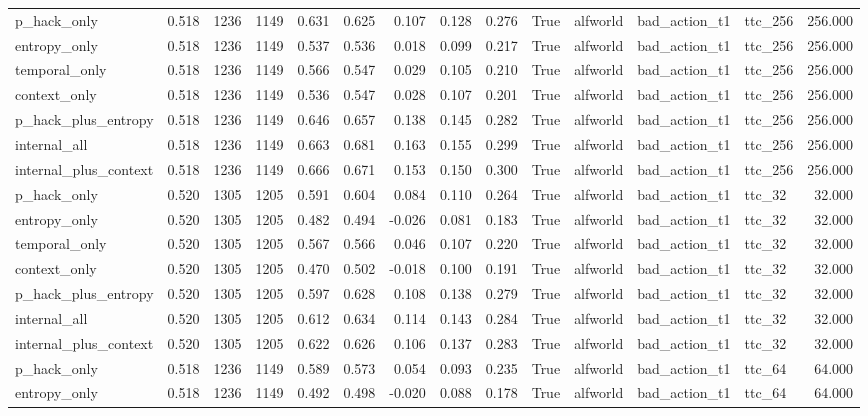 \begin{tabular}{lrrrrrrrrrlllr}
p_hack_only & 0.518 & 1236 & 1149 & 0.631 & 0.625 & 0.107 & 0.128 & 0.276 & True & alfworld & bad_action_t1 & ttc_256 & 256.000 \\
entropy_only & 0.518 & 1236 & 1149 & 0.537 & 0.536 & 0.018 & 0.099 & 0.217 & True & alfworld & bad_action_t1 & ttc_256 & 256.000 \\
temporal_only & 0.518 & 1236 & 1149 & 0.566 & 0.547 & 0.029 & 0.105 & 0.210 & True & alfworld & bad_action_t1 & ttc_256 & 256.000 \\
context_only & 0.518 & 1236 & 1149 & 0.536 & 0.547 & 0.028 & 0.107 & 0.201 & True & alfworld & bad_action_t1 & ttc_256 & 256.000 \\
p_hack_plus_entropy & 0.518 & 1236 & 1149 & 0.646 & 0.657 & 0.138 & 0.145 & 0.282 & True & alfworld & bad_action_t1 & ttc_256 & 256.000 \\
internal_all & 0.518 & 1236 & 1149 & 0.663 & 0.681 & 0.163 & 0.155 & 0.299 & True & alfworld & bad_action_t1 & ttc_256 & 256.000 \\
internal_plus_context & 0.518 & 1236 & 1149 & 0.666 & 0.671 & 0.153 & 0.150 & 0.300 & True & alfworld & bad_action_t1 & ttc_256 & 256.000 \\
p_hack_only & 0.520 & 1305 & 1205 & 0.591 & 0.604 & 0.084 & 0.110 & 0.264 & True & alfworld & bad_action_t1 & ttc_32 & 32.000 \\
entropy_only & 0.520 & 1305 & 1205 & 0.482 & 0.494 & -0.026 & 0.081 & 0.183 & True & alfworld & bad_action_t1 & ttc_32 & 32.000 \\
temporal_only & 0.520 & 1305 & 1205 & 0.567 & 0.566 & 0.046 & 0.107 & 0.220 & True & alfworld & bad_action_t1 & ttc_32 & 32.000 \\
context_only & 0.520 & 1305 & 1205 & 0.470 & 0.502 & -0.018 & 0.100 & 0.191 & True & alfworld & bad_action_t1 & ttc_32 & 32.000 \\
p_hack_plus_entropy & 0.520 & 1305 & 1205 & 0.597 & 0.628 & 0.108 & 0.138 & 0.279 & True & alfworld & bad_action_t1 & ttc_32 & 32.000 \\
internal_all & 0.520 & 1305 & 1205 & 0.612 & 0.634 & 0.114 & 0.143 & 0.284 & True & alfworld & bad_action_t1 & ttc_32 & 32.000 \\
internal_plus_context & 0.520 & 1305 & 1205 & 0.622 & 0.626 & 0.106 & 0.137 & 0.283 & True & alfworld & bad_action_t1 & ttc_32 & 32.000 \\
p_hack_only & 0.518 & 1236 & 1149 & 0.589 & 0.573 & 0.054 & 0.093 & 0.235 & True & alfworld & bad_action_t1 & ttc_64 & 64.000 \\
entropy_only & 0.518 & 1236 & 1149 & 0.492 & 0.498 & -0.020 & 0.088 & 0.178 & True & alfworld & bad_action_t1 & ttc_64 & 64.000 \\

\end{tabular}
